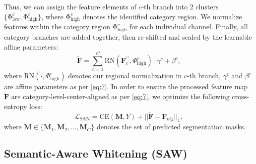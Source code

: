 \documentclass[10pt,twocolumn,letterpaper]{article}
\begin{document}
Thus, we can assign the feature elements of $c$-th branch into 2 clusters $\{\mathrm{\Phi}_{\mathrm{low}}^{c},\mathrm{\Phi}_{\mathrm{high}}^{c}\}$, where $\mathrm{\Phi}_{\mathrm{high}}^{c}$ denotes the identified category region. We normalize features within the category region $\mathrm{\Phi}_{\mathrm{high}}^{c}$ for each individual channel. Finally, all category branches are added together, then re-shifted and scaled by the learnable affine parameters:
\vspace{-0.8mm}
\begin{equation}
\mathbf{\widetilde{F}}=\sum_{c=1}^{C}\mathrm{RN}(\mathbf{F}_{c}^{\prime\prime},\Phi_{\mathrm{high}}^{c})\cdot\gamma^{c}+\beta^{c},
\end{equation}
where $\mathrm{RN}(\cdot,\Phi_{\mathrm{high}}^{c})$ denotes our regional normalization in $c$-th branch, $\gamma^{c}$ and $\beta^{c}$ are affine parameters as per \cref{eq:7}.
In order to ensure the processed feature map $\widetilde{\mathbf{F}}$ are category-level-center-aligned as per \cref{eq:7}, we optimize the following cross-entropy loss:
\vspace{-0.8mm}
\begin{equation}
\mathcal{L}_{\mathrm{SAN}}=\mathrm{CE}(\mathbf{M},Y)+||\mathbf{\widetilde{F}}-\mathbf{F}_{obj}||_{1},
\end{equation}
where $\mathbf{M}\in\{\mathbf{M}_{1},\mathbf{M}_{2},...,\mathbf{M}_{C}\}$ denotes the set of predicted segmentation masks.


\subsection{Semantic-Aware Whitening (SAW) \label{subsec:Channel Feature Constraint (CFC)}}
\end{document}
